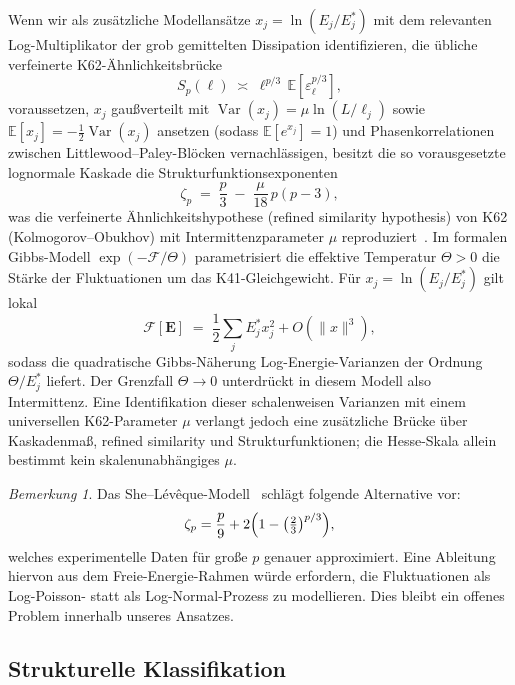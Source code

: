 \documentclass[12pt,a4paper]{article}
\theoremstyle{definition}
\theoremstyle{plain}
\theoremstyle{remark}
\newtheorem{remark}[definition]{Bemerkung}
\begin{document}
Wenn wir als zusätzliche Modellansätze $x_j=\ln(E_j/E_j^*)$ mit dem relevanten
Log-Multiplikator der grob gemittelten Dissipation identifizieren, die
übliche verfeinerte K62-Ähnlichkeitsbrücke
\[
  S_p(\ell) \;\asymp\; \ell^{p/3}\,\mathbb{E}[\varepsilon_\ell^{p/3}],
\]
voraussetzen, $x_j$ gaußverteilt mit $\operatorname{Var}(x_j)=\mu\ln(L/\ell_j)$
sowie $\mathbb{E}[x_j]=-\tfrac12\operatorname{Var}(x_j)$ ansetzen (sodass
$\mathbb{E}[e^{x_j}]=1$) und Phasenkorrelationen zwischen
Littlewood--Paley-Blöcken vernachlässigen, besitzt die so vorausgesetzte
lognormale Kaskade die Strukturfunktionsexponenten
\begin{equation}\label{eq:zeta_p}
  \zeta_p
  \;=\;
  \frac{p}{3}
  \;-\;
  \frac{\mu}{18}\,p(p-3),
\end{equation}
was die verfeinerte Ähnlichkeitshypothese (refined similarity hypothesis)
von K62 (Kolmogorov--Obukhov) mit Intermittenzparameter $\mu$
reproduziert~\cite{K62,Frisch95}. Im formalen Gibbs-Modell
$\exp(-\mathcal{F}/\Theta)$ parametrisiert die effektive Temperatur
$\Theta > 0$ die Stärke der Fluktuationen um das K41-Gleichgewicht. Für
$x_j=\ln(E_j/E_j^*)$ gilt lokal
\[
  \mathcal{F}[\mathbf{E}]
  \;=\;
  \frac{1}{2}\sum_j E_j^* x_j^2 + O(\|x\|^3),
\]
sodass die quadratische Gibbs-Näherung Log-Energie-Varianzen der Ordnung
$\Theta/E_j^*$ liefert. Der Grenzfall $\Theta\to0$ unterdrückt in diesem
Modell also Intermittenz. Eine Identifikation dieser schalenweisen
Varianzen mit einem universellen K62-Parameter $\mu$ verlangt jedoch eine
zusätzliche Brücke über Kaskadenmaß, refined similarity und
Strukturfunktionen; die Hesse-Skala allein bestimmt kein
skalenunabhängiges $\mu$.

\begin{remark}
Das She--Lévêque-Modell~\cite{SL94} schlägt folgende Alternative vor:
\[
  \zeta_p = \frac{p}{9} + 2\Bigl(1 - \bigl(\tfrac{2}{3}\bigr)^{p/3}\Bigr),
\]
welches experimentelle Daten für große $p$ genauer approximiert. Eine Ableitung hiervon
aus dem Freie-Energie-Rahmen würde erfordern, die Fluktuationen als
Log-Poisson- statt als Log-Normal-Prozess zu modellieren. Dies bleibt ein offenes Problem
innerhalb unseres Ansatzes.
\end{remark}

\subsection{Strukturelle Klassifikation}\label{sec:resolvent-cascade}
\end{document}
